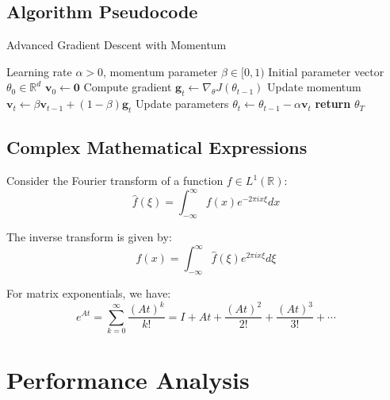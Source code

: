 \documentclass[12pt,a4paper,twoside]{article}
\theoremstyle{definition}
\newcommand{\RealNumbers}{\mathbb{R}}
\begin{document}
\subsection{Algorithm Pseudocode}

\begin{algorithm}[H]
\caption{Advanced Gradient Descent with Momentum}
\begin{algorithmic}[1]
\Require Learning rate $\alpha > 0$, momentum parameter $\beta \in [0,1)$
\Require Initial parameter vector $\theta_0 \in \RealNumbers^d$
\State $\mathbf{v}_0 \leftarrow \mathbf{0}$
    \State Compute gradient $\mathbf{g}_t \leftarrow \nabla_\theta J(\theta_{t-1})$
    \State Update momentum $\mathbf{v}_t \leftarrow \beta \mathbf{v}_{t-1} + (1-\beta) \mathbf{g}_t$
    \State Update parameters $\theta_t \leftarrow \theta_{t-1} - \alpha \mathbf{v}_t$
\EndFor
\State \textbf{return} $\theta_T$
\end{algorithmic}
\end{algorithm}

\subsection{Complex Mathematical Expressions}

Consider the Fourier transform of a function $f \in L^1(\RealNumbers)$:
\begin{equation}
\hat{f}(\xi) = \int_{-\infty}^{\infty} f(x) e^{-2\pi i x \xi} dx
\end{equation}

The inverse transform is given by:
\begin{equation}
f(x) = \int_{-\infty}^{\infty} \hat{f}(\xi) e^{2\pi i x \xi} d\xi
\end{equation}

For matrix exponentials, we have:
\begin{equation}
e^{At} = \sum_{k=0}^{\infty} \frac{(At)^k}{k!} = I + At + \frac{(At)^2}{2!} + \frac{(At)^3}{3!} + \cdots
\end{equation}

\section{Performance Analysis}
\end{document}
